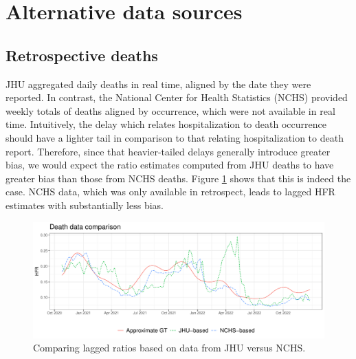 \documentclass{article}
\begin{document}

\section{Alternative data sources}
\label{apx:alternatives}

\subsection{Retrospective deaths}
\label{apx:NCHS_deaths}

JHU aggregated daily deaths in real time, aligned by the date they were
reported. In contrast, the National Center for Health Statistics (NCHS) provided
weekly totals of deaths aligned by occurrence, which were not available in real  
time. Intuitively, the delay which relates hospitalization to death occurrence
should have a lighter tail in comparison to that relating hospitalization to
death report. Therefore, since that heavier-tailed delays generally introduce
greater bias, we would expect the ratio estimates computed from JHU deaths to
have greater bias than those from NCHS deaths. Figure \ref{fig:jhu_vs_nchs}
shows that this is indeed the case. NCHS data, which was only available in
retrospect, leads to lagged HFR estimates with substantially less bias.    

\begin{figure}[h]
\centering
\includegraphics[width=\linewidth]{Figures/Real/jhu_vs_nchs.pdf}
\caption{Comparing lagged ratios based on data from JHU versus NCHS.}
\label{fig:jhu_vs_nchs}
\end{figure}
\end{document}
